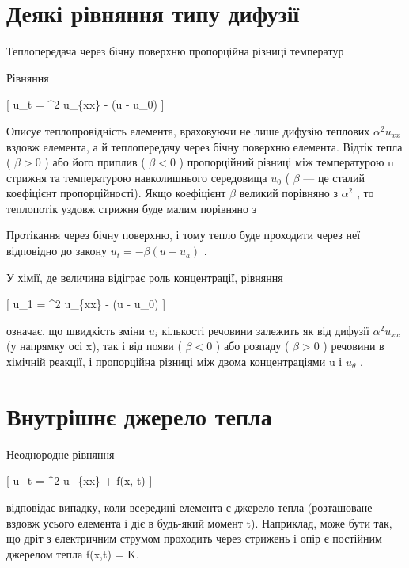 \documentclass[
  ukrainian,
]{article}
\begin{document}
\section{Деякі рівняння типу
дифузії}\label{ux434ux435ux44fux43aux456-ux440ux456ux432ux43dux44fux43dux43dux44f-ux442ux438ux43fux443-ux434ux438ux444ux443ux437ux456ux457}

Теплопередача через бічну поверхню пропорційна різниці температур

Рівняння

{[} u\_t = \alpha\^{}2 u\_\{xx\} - \beta (u - u\_0) {]}

Описує теплопровідність елемента, враховуючи не лише дифузію теплових
\(\alpha^2 u_{xx}\) вздовж елемента, а й теплопередачу через бічну
поверхню елемента. Відтік тепла ( \(\beta > 0\) ) або його приплив (
\(\beta < 0\) ) пропорційний різниці між температурою u стрижня та
температурою навколишнього середовища \(u_0\) ( \(\beta\) --- це сталий
коефіцієнт пропорційності). Якщо коефіцієнт \(\beta\) великий порівняно
з \(\alpha^2\) , то теплопотік уздовж стрижня буде малим порівняно з

Протікання через бічну поверхню, і тому тепло буде проходити через неї
відповідно до закону \(u_t = -\beta (u - u_a)\) .

У хімії, де величина відіграє роль концентрації, рівняння

{[} u\_1 = \alpha\^{}2 u\_\{xx\} - \beta (u - u\_0) {]}

означає, що швидкість зміни \(u_i\) кількості речовини залежить як від
дифузії \(\alpha^2 u_{xx}\) (у напрямку осі x), так і від появи (
\(\beta < 0\) ) або розпаду ( \(\beta > 0\) ) речовини в хімічній
реакції, і пропорційна різниці між двома концентраціями u і
\(u_{\theta}\) .

\section{Внутрішнє джерело
тепла}\label{ux432ux43dux443ux442ux440ux456ux448ux43dux454-ux434ux436ux435ux440ux435ux43bux43e-ux442ux435ux43fux43bux430}

Неоднородне рівняння

{[} u\_t = \alpha\^{}2 u\_\{xx\} + f(x, t) {]}

відповідає випадку, коли всередині елемента є джерело тепла (розташоване
вздовж усього елемента і діє в будь-який момент t). Наприклад, може бути
так, що дріт з електричним струмом проходить через стрижень і опір є
постійним джерелом тепла f(x,t) = K.
\end{document}
